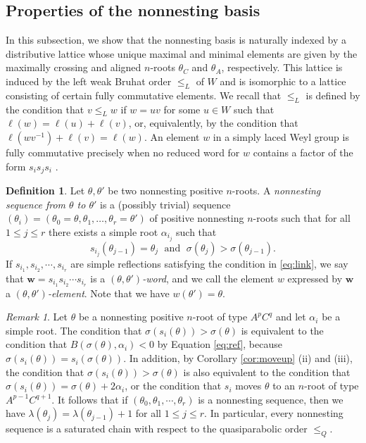 \documentclass[11pt]{amsart}
\theoremstyle{plain}
\theoremstyle{definition}
\newtheorem{defn}[theorem]{Definition}
\theoremstyle{remark}
\newtheorem{rmk}[theorem]{Remark}
\numberwithin{equation}{subsection}
\newcommand{\al}{\alpha}
\newcommand{\bfw}{\mathbf{w}}
\newcommand{\inverse}{^{-1}}
\begin{document}
\subsection{Properties of the nonnesting basis}
\label{sec:nnbasis}
In this subsection, we show that the nonnesting basis is naturally indexed by a
distributive lattice whose unique maximal and minimal elements are given by the
maximally crossing and aligned $n$-roots $\theta_C$ and $\theta_A$,
respectively. This lattice is induced by the left weak Bruhat order $\le_L$ of
$W$ and is isomorphic to a lattice consisting of certain fully commutative
elements. We recall that $\le_L$ is defined by the condition that $v\le_L w$ if
$w=uv$ for some $u\in W$ such that $\ell(w)=\ell(u)+\ell(v)$, or,  equivalently,
by the condition that $\ell(wv\inverse)+\ell(v)=\ell(w)$. An element $w$ in a
simply laced Weyl group is fully commutative precisely when no reduced word for
$w$ contains a factor of the form $s_i s_j s_i$ \cite{FC}.



\begin{defn}\label{def:nestchain}
Let $\theta,\theta'$ be two nonnesting positive $n$-roots.  A {\it nonnesting
sequence from $\theta$ to $\theta'$} is a (possibly trivial) sequence
$(\theta_i) = (\theta_0=\theta, \theta_1, \ldots, \theta_r=\theta')$ of positive
nonnesting $n$-roots such that for all $1 \leq j \leq r$ there exists a simple
root $\al_{i_j}$ such that
\begin{equation}
    \label{eq:link} s_{i_j}(\theta_{j-1})=\theta_j\;\text{ and
          }\;\sigma(\theta_j)>\sigma(\theta_{j-1}).
      \end{equation}  If $s_{i_1}, s_{i_2}, \cdots, s_{i_r}$ are simple
    reflections satisfying the condition in \eqref{eq:link}, we say that $\bfw =
    s_{i_1} s_{i_2} \cdots s_{i_r}$ is a \emph{$(\theta,\theta')$-word}, and we
    call the element $w$ expressed by $\bfw$ a
    \emph{$(\theta,\theta')$-element}. Note that we have $w(\theta')=\theta$.
\end{defn}

\begin{rmk}
    \label{rmk:link}
Let $\theta$ be a nonnesting positive $n$-root of type $A^pC^q$ and let $\al_i$
be a simple root. The condition that $\sigma(s_i(\theta))>\sigma(\theta)$ is
equivalent to the condition that $B(\sigma(\theta),\al_i)<0$ by Equation
\eqref{eq:ref}, because $\sigma(s_i(\theta))=s_i(\sigma(\theta))$. In addition,
by Corollary \ref{cor:moveup} (ii) and (iii), the condition that
$\sigma(s_i(\theta))>\sigma(\theta)$ is also equivalent to the condition that
$\sigma(s_i(\theta))=\sigma(\theta)+2\al_i$, or the condition that $s_i$ moves
$\theta$ to an $n$-root of type $A^{p-1}C^{q+1}$.  It follows that if
$(\theta_0,\theta_1,\cdots,\theta_r)$ is a nonnesting sequence, then we have
$\lambda(\theta_j)=\lambda(\theta_{j-1})+1$ for all $1\le j\le r$. In
particular, every nonnesting sequence is a saturated chain with respect to the
quasiparabolic order $\le_Q$.
\end{rmk}
\end{document}
